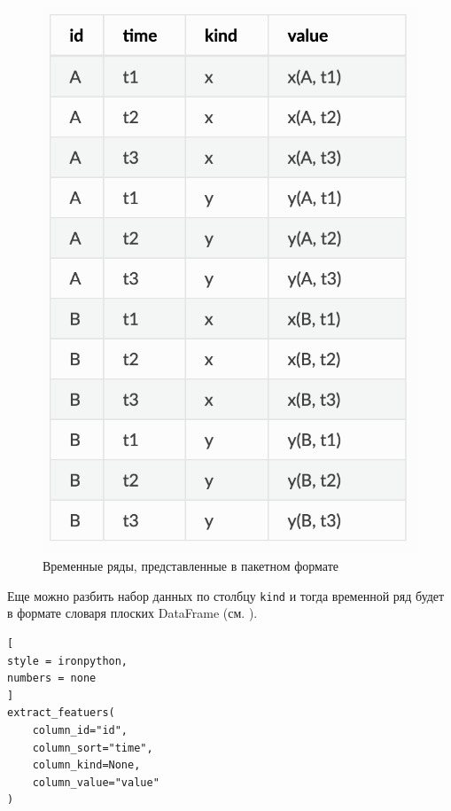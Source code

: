 \documentclass[%
	11pt,
	a4paper,
	utf8,
		]{article}
\begin{document}
\begin{figure}[h]
	\centering
	\includegraphics[scale=0.25]{figures/stack_df_ts.png}
	\caption{ Временные ряды, представленные в пакетном формате }\label{fig:stack_df_ts}
\end{figure}

Еще можно разбить набор данных по столбцу \texttt{kind} и тогда временной ряд будет в формате словаря плоских DataFrame (см. ).

\begin{lstlisting}[
style = ironpython,
numbers = none	
]
extract_featuers(
    column_id="id",
    column_sort="time",
    column_kind=None,
    column_value="value"
)
\end{lstlisting}
\end{document}
